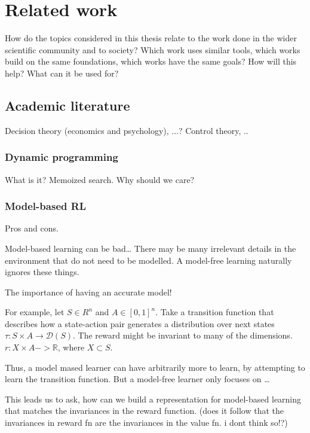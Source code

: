 \chapter{Related work}

How do the topics considered in this thesis relate to the work done in the wider scientific community and to society? Which work uses similar tools, which works build on the same foundations, which works have the same goals? How will this help? What can it be used for?

\hypertarget{related-work}{%
\section{Academic literature}\label{related-work}}

Decision theory (economics and psychology), ...?
Control theory, ..

\hypertarget{dynamic-programming}{%
\subsection{Dynamic programming}\label{dynamic-programming}}

What is it? Memoized search. Why should we care?

\hypertarget{model-based-rl}{%
\subsection{Model-based RL}\label{model-based-rl}}

Pros and cons.

Model-based learning can be bad\ldots{} There may be many irrelevant
details in the environment that do not need to be modelled. A model-free
learning naturally ignores these things.

The importance of having an accurate model!

For example, let \(S\in R^n\) and \(A\in [0, 1]^n\). Take a transition
function that describes how a state-action pair generates a distribution
over next states \(\tau: S \times A \to \mathcal D(S)\). The reward
might be invariant to many of the dimensions.
\(r: X \times A -> \mathbb R\), where \(X \subset S\).

Thus, a model mased learner can have arbitrarily more to learn, by
attempting to learn the transition function. But a model-free learner
only focuses on \ldots{}

This leads us to ask, how can we build a representation for model-based
learning that matches the invariances in the reward function. (does it
follow that the invariances in reward fn are the invariances in the
value fn. i dont think so!?)


